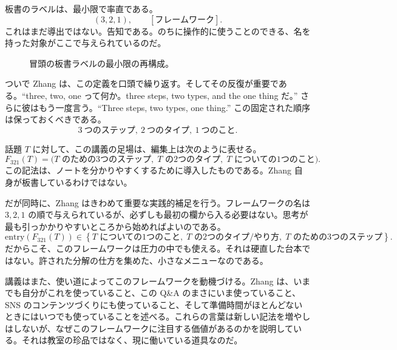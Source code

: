板書のラベルは、最小限で率直である。
\begin{equation}
\left(3,2,1\right),
\qquad
\left[\text{フレームワーク}\right].
\end{equation}
これはまだ導出ではない。告知である。のちに操作的に使うことのできる、名を持った対象がここで与えられているのだ。

\begin{figure}[h]
\centering
{}
\caption{冒頭の板書ラベルの最小限の再構成。}
\end{figure}

ついで Zhang は、この定義を口頭で繰り返す。そしてその反復が重要である。``three, two, one って何か。three steps, two types, and the one thing だ。'' さらに彼はもう一度言う。``Three steps, two types, one thing.'' この固定された順序は保っておくべきである。
\begin{equation}
3\ \text{つのステップ},\ 2\ \text{つのタイプ},\ 1\ \text{つのこと}.
\end{equation}

\begin{definition}
話題 \(T\) に対して、この講義の足場は、編集上は次のように表せる。
\begin{equation}
F_{321}(T)
=
\bigl(
\text{\(T\) のための3つのステップ},\;
\text{\(T\) の2つのタイプ},\;
\text{\(T\) についての1つのこと}
\bigr).
\end{equation}
この記法は、ノートを分かりやすくするために導入したものである。Zhang 自身が板書しているわけではない。
\end{definition}

だが同時に、Zhang はきわめて重要な実践的補足を行う。フレームワークの名は \(3,2,1\) の順で与えられているが、必ずしも最初の欄から入る必要はない。思考が最も引っかかりやすいところから始めればよいのである。
\begin{equation}
\text{entry}(F_{321}(T))
\in
\left\{
\text{\(T\) についての1つのこと},\;
\text{\(T\) の2つのタイプ/やり方},\;
\text{\(T\) のための3つのステップ}
\right\}.
\end{equation}
だからこそ、このフレームワークは圧力の中でも使える。それは硬直した台本ではない。許された分解の仕方を集めた、小さなメニューなのである。

講義はまた、使い道によってこのフレームワークを動機づける。Zhang は、いまでも自分がこれを使っていること、この Q\&A のまさにいま使っていること、SNS のコンテンツづくりにも使っていること、そして準備時間がほとんどないときにはいつでも使っていることを述べる。これらの言葉は新しい記法を増やしはしないが、なぜこのフレームワークに注目する価値があるのかを説明している。それは教室の珍品ではなく、現に働いている道具なのだ。

